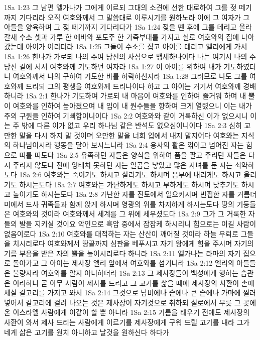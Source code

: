 1Sa 1:23  그 남편 엘가나가 그에게 이르되 그대의 소견에 선한 대로하여 그를 젖 떼기까지 기다리라 오직 여호와께서 그 말씀대로 이루시기를 원하노라 이에 그 여자가 그 아들을 양육하며 그 젖 떼기까지 기다리다가
1Sa 1:24  젖을 뗀 후에 그를 데리고 올라갈새 수소 셋과 가루 한 에바와 포도주 한 가죽부대를 가지고 실로 여호와의 집에 나아갔는데 아이가 어리더라
1Sa 1:25  그들이 수소를 잡고 아이를 데리고 엘리에게 가서
1Sa 1:26  한나가 가로되 나의 주여 당신의 사심으로 맹세하나이다 나는 여기서 나의 주 당신 곁에 서서 여호와께 기도하던 여자라
1Sa 1:27  이 아이를 위하여 내가 기도하였더니 여호와께서 나의 구하여 기도한 바를 허락하신지라
1Sa 1:28  그러므로 나도 그를 여호와께 드리되 그의 평생을 여호와께 드리나이다 하고 그 아이는 거기서 여호와께 경배하니라
1Sa 2:1  한나가 기도하여 가로되 내 마음이 여호와를 인하여 즐거워 하며 내 뿔이 여호와를 인하여 높아졌으며 내 입이 내 원수들을 향하여 크게 열렸으니 이는 내가 주의 구원을 인하여 기뻐함이니이다
1Sa 2:2  여호와와 같이 거룩하신 이가 없으시니 이는 주 밖에 다른 이가 없고 우리 하나님 같은 반석도 없으심이니이다
1Sa 2:3  심히 교만한 말을 다시 하지 말 것이며 오만한 말을 너희 입에서 내지 말지어다 여호와는 지식의 하나님이시라 행동을 달아 보시느니라
1Sa 2:4  용사의 활은 꺾이고 넘어진 자는 힘으로 띠를 띠도다
1Sa 2:5  유족하던 자들은 양식을 위하여 품을 팔고 주리던 자들은 다시 주리지 않도다 전에 잉태치 못하던 자는 일곱을 낳았고 많은 자녀를 둔 자는 쇠약하도다
1Sa 2:6  여호와는 죽이기도 하시고 살리기도 하시며 음부에 내리게도 하시고 올리기도 하시는도다
1Sa 2:7  여호와는 가난하게도 하시고 부하게도 하시며 낮추기도 하시고 높이기도 하시는도다
1Sa 2:8  가난한 자를 진토에서 일으키시며 빈핍한 자를 거름더미에서 드사 귀족들과 함께 앉게 하시며 영광의 위를 차지하게 하시는도다 땅의 기둥들은 여호와의 것이라 여호와께서 세계를 그 위에 세우셨도다
1Sa 2:9  그가 그 거룩한 자들의 발을 지키실 것이요 악인으로 흑암 중에서 잠잠케 하시리니 힘으로는 이길 사람이 없음이로다
1Sa 2:10  여호와를 대적하는 자는 산산이 깨어질 것이라 하늘 우뢰로 그들을 치시리로다 여호와께서 땅끝까지 심판을 베푸시고 자기 왕에게 힘을 주시며 자기의 기름 부음을 받은 자의 뿔을 높이시리로다 하니라
1Sa 2:11  엘가나는 라마의 자기 집으로 돌아가고 그 아이는 제사장 엘리 앞에서 여호와를 섬기니라
1Sa 2:12  엘리의 아들들은 불량자라 여호와를 알지 아니하더라
1Sa 2:13  그 제사장들이 백성에게 행하는 습관은 이러하니 곧 아무 사람이 제사를 드리고 그 고기를 삶을 때에 제사장의 사환이 손에 세살 갈고리를 가지고 와서
1Sa 2:14  그것으로 남비에나 솥에나 큰 솥에나 가마에 찔러 넣어서 갈고리에 걸려 나오는 것은 제사장이 자기것으로 취하되 실로에서 무릇 그 곳에 온 이스라엘 사람에게 이같이 할 뿐 아니라
1Sa 2:15  기름을 태우기 전에도 제사장의 사환이 와서 제사 드리는 사람에게 이르기를 제사장에게 구워 드릴 고기를 내라 그가 네게 삶은 고기를 원치 아니하고 날것을 원하신다 하다가
